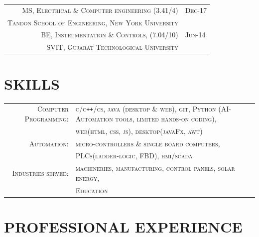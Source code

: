 \documentclass[a4paper]{article}
\begin{document}
\begin{tabular}{rl}
\small{}	\textsc{	MS, Electrical \& Computer engineering \small {(3.41/4)}		} 	& 		\textsc{	Dec-17 	\faGraduationCap		}	\\
 		\textsc{	Tandon School of Engineering, New York University \nyu\;		}	& 												\\
 \small{}	\textsc{	BE, Instrumentation \small{\&} Controls, \small {(7.04/10)}		} 	& 		\textsc{	Jun-14	\faGraduationCap		}	\\
 		\textsc{	SVIT, Gujarat Technological University					}	& 												\\
\end{tabular}




\vspace{-0.7em} %
\section{\hfill \textbf{SKILLS}}
	\begin{tabular}{rl}	\small{}
	 	\small{}\textsc{		Computer Programming:	}	& \textsc{					\small{c/c\texttt{++}/cs}, java (desktop \& web), git, Python (AI-Automation tools, limited hands-on coding),			}	\\
  												& \textsc{					web(html, css, js), desktop(javaFx, awt)							} 	\\
 		\small{}\textsc{		Automation:			}	& \textsc{					micro-controllers \& single board computers,						}	\\
  												& \textsc{					PLCs(ladder-logic, FBD), hmi/scada								} 	\\
 		\small{}\textsc{		Industries served:		}	& \textsc{					machineries, manufacturing, control panels, solar energy,				}	\\
  												& \textsc{					Education													} 	\\
	\end{tabular}

\vspace{-0.7em} %
\section{\hfill \textbf{PROFESSIONAL EXPERIENCE}}
\end{document}
